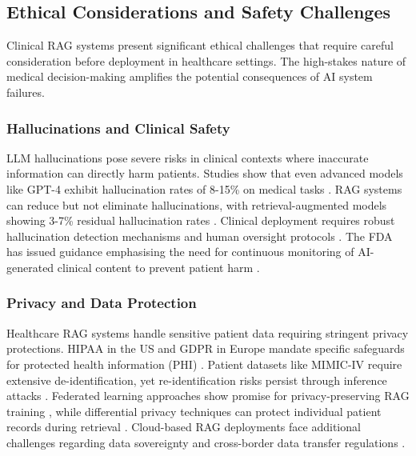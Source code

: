 \subsection{Ethical Considerations and Safety Challenges}

Clinical RAG systems present significant ethical challenges that require careful consideration before deployment in healthcare settings. The high-stakes nature of medical decision-making amplifies the potential consequences of AI system failures.

\subsubsection{Hallucinations and Clinical Safety}
LLM hallucinations pose severe risks in clinical contexts where inaccurate information can directly harm patients. Studies show that even advanced models like GPT-4 exhibit hallucination rates of 8-15\% on medical tasks \citep{alkaissi2023artificial}. RAG systems can reduce but not eliminate hallucinations, with retrieval-augmented models showing 3-7\% residual hallucination rates \citep{shuster2021retrieval}. Clinical deployment requires robust hallucination detection mechanisms and human oversight protocols \citep{ji2023survey}. The FDA has issued guidance emphasising the need for continuous monitoring of AI-generated clinical content to prevent patient harm \citep{fda2023ai}.

\subsubsection{Privacy and Data Protection}
Healthcare RAG systems handle sensitive patient data requiring stringent privacy protections. HIPAA in the US and GDPR in Europe mandate specific safeguards for protected health information (PHI) \citep{hipaa2023privacy}. Patient datasets like MIMIC-IV require extensive de-identification, yet re-identification risks persist through inference attacks \citep{rocher2019estimating}. Federated learning approaches show promise for privacy-preserving RAG training \citep{li2023federated}, while differential privacy techniques can protect individual patient records during retrieval \citep{dwork2014differential}. Cloud-based RAG deployments face additional challenges regarding data sovereignty and cross-border data transfer regulations \citep{gdpr2018regulation}.

